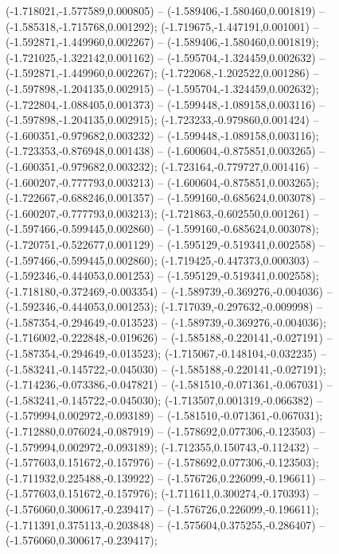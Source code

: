  (-1.718021,-1.577589,0.000805) -- (-1.589406,-1.580460,0.001819) -- (-1.585318,-1.715768,0.001292);
 (-1.719675,-1.447191,0.001001) -- (-1.592871,-1.449960,0.002267) -- (-1.589406,-1.580460,0.001819);
 (-1.721025,-1.322142,0.001162) -- (-1.595704,-1.324459,0.002632) -- (-1.592871,-1.449960,0.002267);
 (-1.722068,-1.202522,0.001286) -- (-1.597898,-1.204135,0.002915) -- (-1.595704,-1.324459,0.002632);
 (-1.722804,-1.088405,0.001373) -- (-1.599448,-1.089158,0.003116) -- (-1.597898,-1.204135,0.002915);
 (-1.723233,-0.979860,0.001424) -- (-1.600351,-0.979682,0.003232) -- (-1.599448,-1.089158,0.003116);
 (-1.723353,-0.876948,0.001438) -- (-1.600604,-0.875851,0.003265) -- (-1.600351,-0.979682,0.003232);
 (-1.723164,-0.779727,0.001416) -- (-1.600207,-0.777793,0.003213) -- (-1.600604,-0.875851,0.003265);
 (-1.722667,-0.688246,0.001357) -- (-1.599160,-0.685624,0.003078) -- (-1.600207,-0.777793,0.003213);
 (-1.721863,-0.602550,0.001261) -- (-1.597466,-0.599445,0.002860) -- (-1.599160,-0.685624,0.003078);
 (-1.720751,-0.522677,0.001129) -- (-1.595129,-0.519341,0.002558) -- (-1.597466,-0.599445,0.002860);
 (-1.719425,-0.447373,0.000303) -- (-1.592346,-0.444053,0.001253) -- (-1.595129,-0.519341,0.002558);
 (-1.718180,-0.372469,-0.003354) -- (-1.589739,-0.369276,-0.004036) -- (-1.592346,-0.444053,0.001253);
 (-1.717039,-0.297632,-0.009998) -- (-1.587354,-0.294649,-0.013523) -- (-1.589739,-0.369276,-0.004036);
 (-1.716002,-0.222848,-0.019626) -- (-1.585188,-0.220141,-0.027191) -- (-1.587354,-0.294649,-0.013523);
 (-1.715067,-0.148104,-0.032235) -- (-1.583241,-0.145722,-0.045030) -- (-1.585188,-0.220141,-0.027191);
 (-1.714236,-0.073386,-0.047821) -- (-1.581510,-0.071361,-0.067031) -- (-1.583241,-0.145722,-0.045030);
 (-1.713507,0.001319,-0.066382) -- (-1.579994,0.002972,-0.093189) -- (-1.581510,-0.071361,-0.067031);
 (-1.712880,0.076024,-0.087919) -- (-1.578692,0.077306,-0.123503) -- (-1.579994,0.002972,-0.093189);
 (-1.712355,0.150743,-0.112432) -- (-1.577603,0.151672,-0.157976) -- (-1.578692,0.077306,-0.123503);
 (-1.711932,0.225488,-0.139922) -- (-1.576726,0.226099,-0.196611) -- (-1.577603,0.151672,-0.157976);
 (-1.711611,0.300274,-0.170393) -- (-1.576060,0.300617,-0.239417) -- (-1.576726,0.226099,-0.196611);
 (-1.711391,0.375113,-0.203848) -- (-1.575604,0.375255,-0.286407) -- (-1.576060,0.300617,-0.239417);
